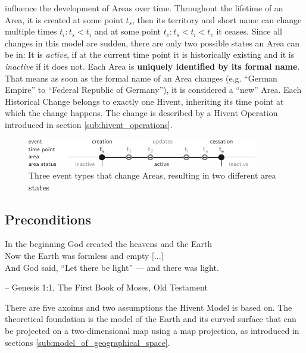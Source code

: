influence the development of Areas over time. Throughout the lifetime of an Area, it is created at some point $t_s$, then its territory and short name can change multiple times $t_i: t_s < t_i$ and at some point $t_e: t_s < t_i < t_e$ it ceases. Since all changes in this model are sudden, there are only two possible states an Area can be in: It is \emph{active}, if at the current time point it is historically existing and it is \emph{inactive} if it does not. Each Area is \textbf{uniquely identified by its formal name}. That means as soon as the formal name of an Area changes (e.g. ``German Empire'' to ``Federal Republic of Germany''), it is considered a ``new'' Area. Each Historical Change belongs to exactly one Hivent, inheriting its time point at which the change happens.  The change is described by a Hivent Operation introduced in section \ref{sub:hivent_operations}.

\begin{figure}[H]
  \vspace{1em}
  \centering
  \includegraphics[width=0.9\textwidth]{graphics/development/hivent_model/area_states}
  \caption{Three event types that change Areas, resulting in two different area states}
  \label{fig:area_states}
\end{figure}




\subsection{Preconditions} %
\label{sub:preconditions}

\begin{quoteit}
In the beginning God created the heavens and the Earth \\
Now the Earth was formless and empty [...] \\
And God said, “Let there be light” --- and there was light.
\end{quoteit}
\vspace{-1em}
\hfill -- Genesis 1:1, The First Book of Moses, Old Testament

There are five axoims and two assumptions the Hivent Model is based on. The theoretical foundation is the model of the Earth and its curved surface that can be projected on a two-dimensional map using a map projection, as introduced in sections \ref{sub:model_of_geographical_space}.


